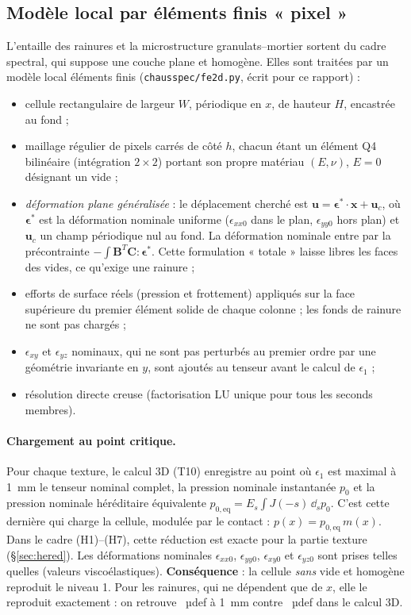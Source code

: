 \subsection{Modèle local par éléments finis « pixel »}\label{sec:n2_ef}
L'entaille des rainures et la microstructure granulats--mortier sortent du cadre spectral, qui
suppose une couche plane et homogène. Elles sont traitées par un modèle local éléments finis
(\texttt{chausspec/fe2d.py}, écrit pour ce rapport) :
\begin{itemize}[nosep]
\item cellule rectangulaire de largeur $W$, périodique en $x$, de hauteur $H$, encastrée au fond ;
\item maillage régulier de pixels carrés de côté $h$, chacun étant un élément Q4 bilinéaire
      (intégration $2\times2$) portant son propre matériau $(E,\nu)$, $E=0$ désignant un vide ;
\item \emph{déformation plane généralisée} : le déplacement cherché est
      $\bm u=\bm\epsilon^\ast\cdot\bm x+\bm u_c$, où $\bm\epsilon^\ast$ est la déformation nominale
      uniforme ($\epsilon_{xx0}$ dans le plan, $\epsilon_{yy0}$ hors plan) et $\bm u_c$ un champ
      périodique nul au fond. La déformation nominale entre par la précontrainte
      $-\int\bm B^T\bm C:\bm\epsilon^\ast$. Cette formulation « totale » laisse libres les faces
      des vides, ce qu'exige une rainure ;
\item efforts de surface réels (pression et frottement) appliqués sur la face supérieure du
      premier élément solide de chaque colonne ; les fonds de rainure ne sont pas chargés ;
\item $\epsilon_{xy}$ et $\epsilon_{yz}$ nominaux, qui ne sont pas perturbés au premier ordre par
      une géométrie invariante en $y$, sont ajoutés au tenseur avant le calcul de
      $\epsilon_1$ ;
\item résolution directe creuse (factorisation LU unique pour tous les seconds membres).
\end{itemize}

\paragraph{Chargement au point critique.} Pour chaque texture, le calcul 3D (T10) enregistre au
point où $\epsilon_1$ est maximal à \SI{1}{mm} le tenseur nominal complet, la pression
nominale instantanée $p_0$ et la pression nominale héréditaire équivalente
$p_{0,\text{eq}}=E_s\int J(-s)\,\dd_s p_0$. C'est cette dernière qui charge la cellule, modulée par
le contact : $p(x)=p_{0,\text{eq}}\,m(x)$. Dans le cadre (H1)--(H7), cette réduction est exacte
pour la partie texture (\S\ref{sec:hered}). Les déformations nominales $\epsilon_{xx0}$,
$\epsilon_{yy0}$, $\epsilon_{xy0}$ et $\epsilon_{yz0}$ sont prises telles quelles (valeurs
viscoélastiques). \textbf{Conséquence} : la cellule \emph{sans} vide et homogène reproduit le niveau
1. Pour les rainures, qui ne dépendent que de $x$, elle le reproduit exactement : on retrouve
\NplanUn{}~µdef à \SI{1}{mm} contre \NtroisDUn{}~µdef dans le calcul 3D.

